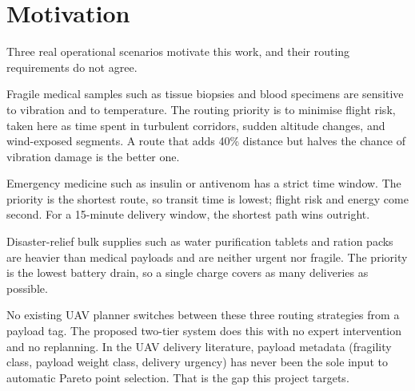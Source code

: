 \documentclass{ssnreview}
\begin{document}
\section{Motivation}

Three real operational scenarios motivate this work, and their routing requirements do
not agree.

Fragile medical samples such as tissue biopsies and blood specimens are sensitive to
vibration and to temperature. The routing priority is to minimise flight risk, taken
here as time spent in turbulent corridors, sudden altitude changes, and wind-exposed
segments. A route that adds 40\% distance but halves the chance of vibration damage is
the better one.

Emergency medicine such as insulin or antivenom has a strict time window. The priority
is the shortest route, so transit time is lowest; flight risk and energy come second.
For a 15-minute delivery window, the shortest path wins outright.

Disaster-relief bulk supplies such as water purification tablets and ration packs are
heavier than medical payloads and are neither urgent nor fragile. The priority is the
lowest battery drain, so a single charge covers as many deliveries as possible.

No existing UAV planner switches between these three routing strategies from a payload
tag. The proposed two-tier system does this with no expert intervention and no
replanning. In the UAV delivery literature, payload metadata (fragility class, payload
weight class, delivery urgency) has never been the sole input to automatic Pareto point
selection. That is the gap this project targets.
\end{document}
